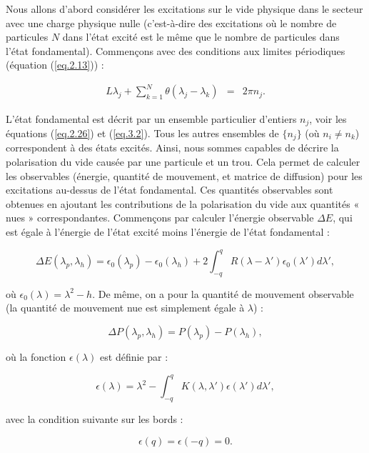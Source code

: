 
Nous allons d'abord considérer les excitations sur le vide physique dans le secteur avec une charge physique nulle (c'est-à-dire des excitations où le nombre de particules \( N \) dans l'état excité est le même que le nombre de particules dans l'état fondamental). Commençons avec des conditions aux limites périodiques (équation (\ref{eq.2.13})) :

\begin{eqnarray}
	L\lambda_j + \sum_{k=1}^N\theta( \lambda_j - \lambda_k ) & =  &2 \pi n_j.
\end{eqnarray}

	
L'état fondamental est décrit par un ensemble particulier d'entiers \( n_j \), voir les équations (\ref{eq.2.26}) et (\ref{eq.3.2}). Tous les autres ensembles de \( \{n_j\} \) (où \( n_i \neq n_k \)) correspondent à des états excités. Ainsi, nous sommes capables de décrire la polarisation du vide causée par une particule et un trou. Cela permet de calculer les observables (énergie, quantité de mouvement, et matrice de diffusion) pour les excitations au-dessus de l'état fondamental. Ces quantités observables sont obtenues en ajoutant les contributions de la polarisation du vide aux quantités « nues » correspondantes. Commençons par calculer l'énergie observable \( \Delta E \), qui est égale à l'énergie de l'état excité moins l'énergie de l'état fondamental :

\[
\Delta E (\lambda_p, \lambda_h) = \epsilon_0 (\lambda_p) - \epsilon_0 (\lambda_h) + 2 \int_{-q}^{q} R(\lambda - \lambda') \epsilon_0(\lambda') d\lambda',
\]

où \( \epsilon_0(\lambda) = \lambda^2 - h \). De même, on a pour la quantité de mouvement observable (la quantité de mouvement nue est simplement égale à \( \lambda \)) :

\[
\Delta P(\lambda_p, \lambda_h) = P(\lambda_p) - P(\lambda_h),
\]

où la fonction \( \epsilon(\lambda) \) est définie par :

\[
\epsilon(\lambda) = \lambda^2 - \int_{-q}^{q} K(\lambda, \lambda') \epsilon(\lambda') d\lambda',
\]

avec la condition suivante sur les bords :

\[
\epsilon(q) = \epsilon(-q) = 0.
\]


